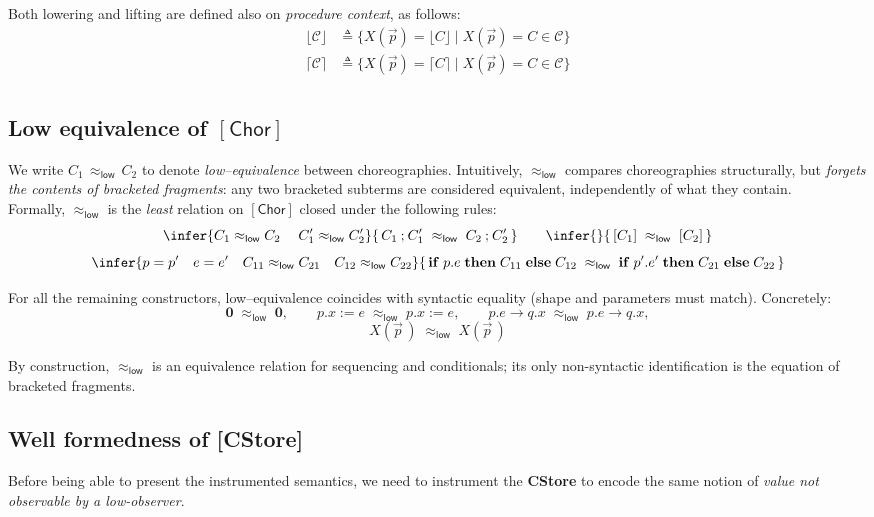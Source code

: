 \documentclass[12pt,a4paper,twoside]{book}
\begin{document}
Both lowering and lifting are defined also on \emph{procedure context}, as follows:
\begin{align*}
	\lfloor \mathscr{C} \rfloor &\triangleq
\{X(\vec{p}) = \lfloor C \rfloor \mid X(\vec{p}) = C \in \mathscr{C}\}\\
	\lceil \mathscr{C} \rceil &\triangleq
\{X(\vec{p}) = \lceil C \rceil \mid X(\vec{p}) = C \in \mathscr{C}\}\\
\end{align*}

\subsection{Low equivalence of $\mathsf{[Chor]}$}
We write \(C_1 \,\approx_{\mathsf{low}}\, C_2\) to denote \emph{low–equivalence} between choreographies.
Intuitively, \(\approx_{\mathsf{low}}\) compares choreographies structurally, but \emph{forgets the
contents of bracketed fragments}: any two bracketed subterms are considered equivalent,
independently of what they contain.\\
Formally, \(\approx_{\mathsf{low}}\) is the \emph{least} relation on \(\mathsf{[Chor]}\) closed under the following rules:
\[
\infer
  {C_1 \approx_{\mathsf{low}} C_2 \quad\; C_1' \approx_{\mathsf{low}} C_2'}
  {\,C_1 \mathbin{;} C_1' \;\approx_{\mathsf{low}}\; C_2 \mathbin{;} C_2'\,}
\qquad
\infer
  {}
  {\,[C_1] \;\approx_{\mathsf{low}}\; [C_2]\,}
\]
\[
\infer
 {p = p' \quad e = e' \quad C_{11} \approx_{\mathsf{low}} C_{21} \quad C_{12} \approx_{\mathsf{low}} C_{22}}
 {\,\mathbf{if}\; p.e\; \mathbf{then}\; C_{11}\; \mathbf{else}\; C_{12}
   \;\approx_{\mathsf{low}}\;
   \mathbf{if}\; p'.e'\; \mathbf{then}\; C_{21}\; \mathbf{else}\; C_{22}\,}
\]

\noindent For all the remaining constructors, low–equivalence coincides with syntactic equality (shape and parameters must match). Concretely:
\[
\boldsymbol{0} \;\approx_{\mathsf{low}}\; \boldsymbol{0},\qquad
p.x \mathrel{:=} e \;\approx_{\mathsf{low}}\; p.x \mathrel{:=} e,\qquad
p.e \rightarrow q.x \;\approx_{\mathsf{low}}\; p.e \rightarrow q.x,
\]
\[
	X(\vec{p}\,)\;\approx_{\mathsf{low}}\; X(\vec{p}\,)
\]

By construction, \(\approx_{\mathsf{low}}\) is an equivalence relation for sequencing and conditionals; its only non-syntactic identification is the equation of  bracketed fragments.

\subsection{Well formedness of \textbf{[CStore]}}
Before being able to present the instrumented semantics, we need to instrument the \textbf{CStore} to encode the same notion of \emph{value not observable by a low-observer}.
\end{document}
